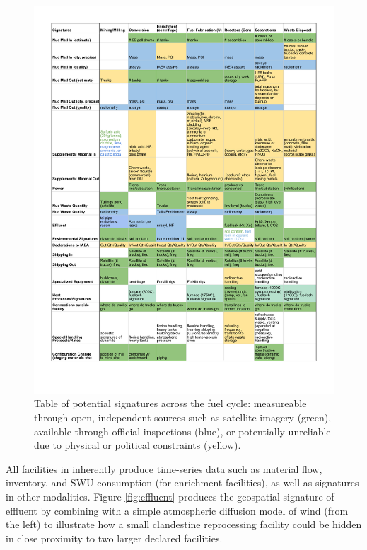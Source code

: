 \begin{figure}%
\begin{center}
\includegraphics[scale=0.8]{./figs/signatures_table.pdf}
\end{center}
\caption{Table of potential signatures across the fuel cycle: measureable through open, independent sources such as satellite imagery (green), available through official inspections (blue), or potentially unreliable due to physical or political constraints (yellow)\cite{kemp_environmental_2016,_plutonium_????,ferreira_radiometric_2012,stork_systematic_2006}.}
\label{fig:signatures}
\end{figure}

All facilities in \Cyclus inherently produce time-series data such as material flow, inventory, and \gls{SWU} consumption (for enrichment facilities), as well as signatures in other modalities. Figure \ref{fig:effluent} produces the geospatial signature of effluent by combining \Cyclus with a simple atmospheric diffusion model of wind (from the left) to illustrate how a small clandestine reprocessing facility could be hidden in close proximity to two larger declared facilities\cite{hanna_handbook_1982}. 

